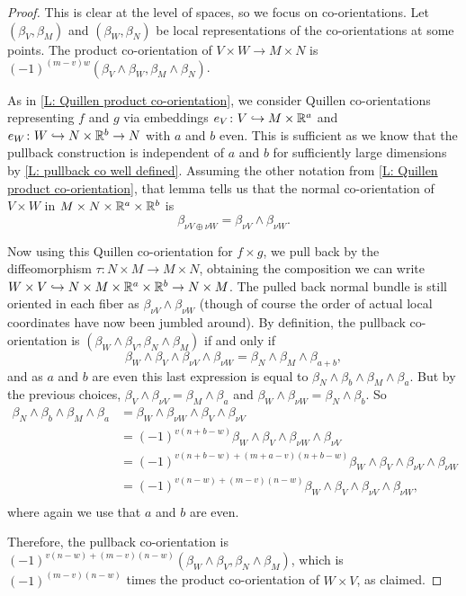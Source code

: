 \begin{proof}
	This is clear at the level of spaces, so we focus on co-orientations. 
	Let $(\beta_V,\beta_M)$ and $(\beta_W,\beta_N)$ be local representations of the co-orientations at some points.
	The product co-orientation of $V \times W \to M \times N$ is $(-1)^{(m-v)w}(\beta_V \wedge \beta_W,\beta_M \wedge \beta_N)$.

	As in \cref{L: Quillen product co-orientation}, we consider Quillen co-orientations representing $f$ and $g$ via embeddings $e_V \colon V \hookrightarrow M \times \mathbb{R}^a$ and $e_W \colon W \hookrightarrow N \times \mathbb{R}^b \to N$ with $a$ and $b$ even.
	This is sufficient as we know that the pullback construction is independent of $a$ and $b$ for sufficiently large dimensions by \cref{L: pullback co well defined}.
	Assuming the other notation from \cref{L: Quillen product co-orientation}, that lemma tells us that the normal co-orientation of $V \times W$ in $M \times N \times \mathbb{R}^a \times \mathbb{R}^b$ is $$\beta_{\nu V \oplus \nu W} = \beta_{\nu V} \wedge \beta_{\nu W}.$$

	Now using this Quillen co-orientation for $f \times g$, we pull back by the diffeomorphism $\tau \colon N \times M \to M \times N$, obtaining the composition we can write $W \times V \hookrightarrow N \times M \times \mathbb{R}^a \times \mathbb{R}^b \to N \times M$.
	The pulled back normal bundle is still oriented in each fiber as $\beta_{\nu V} \wedge \beta_{\nu W}$ (though of course the order of actual local coordinates have now been jumbled around).
	By definition, the pullback co-orientation is $(\beta_W \wedge \beta_V,\beta_N \wedge \beta_M)$ if and only if $$\beta_W \wedge \beta_V \wedge \beta_{\nu V} \wedge \beta_{\nu W} = \beta_N \wedge \beta_M \wedge \beta_{a+b},$$
	and as $a$ and $b$ are even this last expression is equal to
	$\beta_N \wedge \beta_b \wedge \beta_M \wedge \beta_{a}.$ But by the previous choices, $\beta_V \wedge \beta_{\nu V} = \beta_M \wedge \beta_a$ and $\beta_W \wedge \beta_{\nu W} = \beta_N \wedge \beta_b$.
	So
	\begin{align*}
		\beta_N \wedge \beta_b \wedge \beta_M \wedge \beta_{a}
		& = \beta_W \wedge \beta_{\nu W} \wedge \beta_V \wedge \beta_{\nu V} \\
		& = (-1)^{v(n+b-w)}\beta_W \wedge \beta_V \wedge \beta_{\nu W} \wedge \beta_{\nu V} \\
		& = (-1)^{v(n+b-w)+(m+a-v)(n+b-w)}\beta_W \wedge \beta_V \wedge \beta_{\nu V} \wedge \beta_{\nu W} \\
		& = (-1)^{v(n-w)+(m-v)(n-w)}\beta_W \wedge \beta_V \wedge \beta_{\nu V} \wedge \beta_{\nu W}, \\
	\end{align*}
	where again we use that $a$ and $b$ are even.

	Therefore, the pullback co-orientation is $(-1)^{v(n-w)+(m-v)(n-w)}(\beta_W \wedge \beta_V,\beta_N \wedge \beta_M)$, which is $(-1)^{(m-v)(n-w)}$ times the product co-orientation of $W \times V$, as claimed.
\end{proof}

